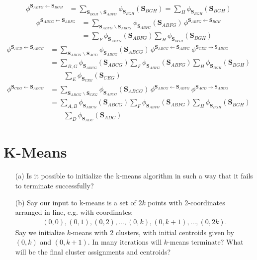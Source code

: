 \documentclass[11pt]{article}
\renewcommand{\vec}[1]{\mathbf{#1}}
\begin{document}
\begin{answertext}{23cm}{}
\begin{align*}
\phi^{\vec{S}_{ABFG}\leftarrow\vec{S}_{BGH}} &= \sum_{\vec{S}_{BGH}\backslash\vec{S}_{ABFG}} \phi_{\vec{S}_{BGH}}(\vec{S}_{BGH}) = \sum_{H} \phi_{\vec{S}_{BGH}}(\vec{S}_{BGH})
\end{align*}
\begin{align*}
\phi^{\vec{S}_{ABCG}\leftarrow\vec{S}_{ABFG}} &= \sum_{\vec{S}_{ABFG}\backslash\vec{S}_{ABCG}} \phi_{\vec{S}_{ABFG}}(\vec{S}_{ABFG}) \,\phi^{\vec{S}_{ABFG}\leftarrow\vec{S}_{BGH}} \\
&= \sum_{F} \phi_{\vec{S}_{ABFG}}(\vec{S}_{ABFG}) \sum_{H} \phi_{\vec{S}_{BGH}}(\vec{S}_{BGH})
\end{align*}
\begin{align*}
\phi^{\vec{S}_{ACD}\leftarrow\vec{S}_{ABCG}} &= \sum_{\vec{S}_{ABCG}\backslash\vec{S}_{ACD}} \phi_{\vec{S}_{ABCG}}(\vec{S}_{ABCG}) \,\phi^{\vec{S}_{ABCG}\leftarrow\vec{S}_{ABFG}} \,\phi^{\vec{S}_{CEG}\to\vec{S}_{ABCG}} \\
&= \sum_{B,G} \phi_{\vec{S}_{ABCG}}(\vec{S}_{ABCG}) \sum_{F} \phi_{\vec{S}_{ABFG}}(\vec{S}_{ABFG}) \sum_{H} \phi_{\vec{S}_{BGH}}(\vec{S}_{BGH}) \\
&\qquad\sum_{E}\phi_{\vec{S}_{CEG}}(\vec{S}_{CEG})
\end{align*}
\begin{align*}
\phi^{\vec{S}_{CEG}\leftarrow\vec{S}_{ABCG}} &= \sum_{\vec{S}_{ABCG}\backslash\vec{S}_{CEG}} \phi_{\vec{S}_{ABCG}}(\vec{S}_{ABCG}) \,\phi^{\vec{S}_{ABCG}\leftarrow\vec{S}_{ABFG}} \,\phi^{\vec{S}_{ACD}\to\vec{S}_{ABCG}} \\
&= \sum_{A,B} \phi_{\vec{S}_{ABCG}}(\vec{S}_{ABCG}) \sum_{F} \phi_{\vec{S}_{ABFG}}(\vec{S}_{ABFG}) \sum_{H} \phi_{\vec{S}_{BGH}}(\vec{S}_{BGH}) \\
&\qquad\sum_{D}\phi_{\vec{S}_{ADC}}(\vec{S}_{ADC})
\end{align*}
\end{answertext}
\pagebreak


\section*{K-Means}

\begin{enumerate}
\item[(a)] Is it possible to initialize the k-means algorithm in such a way that it fails to terminate successfully?

\item[(b)] Say our input to k-means is a set of $2k$ points with 2-coordinates arranged in line, e.g. with coordinates:
{\small
\begin{align*}
(0,0), (0,1), (0, 2), \ldots, (0,k), (0,k+1), \ldots, (0,2k).
\end{align*}
}
Say we initialize $k$-means with 2 clusters, with initial centroids given by $(0,k)$ and $(0,k+1)$.  In many iterations will $k$-means terminate?  What will be the final cluster assignments and centroids?
\end{enumerate}
\end{document}
